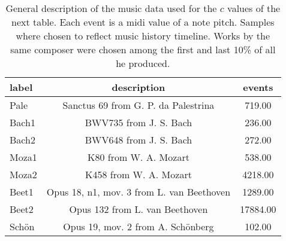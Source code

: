 \begin{table}[h!]
\begin{center}
\begin{tabular}{| l | c | c |}\hline
label & description & events \\\hline
Pale & Sanctus 69 from G. P. da Palestrina  & 719.00 \\\hline
Bach1 & BWV735 from J. S. Bach  & 236.00 \\\hline
Bach2 & BWV648 from J. S. Bach  & 272.00 \\\hline
Moza1 & K80 from W. A. Mozart  & 538.00 \\\hline
Moza2 & K458 from W. A. Mozart  & 4218.00 \\\hline
Beet1 & Opus 18, n1, mov. 3 from L. van Beethoven  & 1289.00 \\\hline
Beet2 & Opus 132 from L. van Beethoven  & 17884.00 \\\hline
Sch\"on & Opus 19, mov. 2 from A. Sch\"onberg  & 102.00 \\\hline
\end{tabular}
\caption{General description of the music data used for the $c$ values of the next table. Each event is a midi value of a note pitch. Samples where chosen to reflect music history timeline. Works by the same composer were chosen among the first and last 10\% of all he produced.}
\end{center}
\end{table}